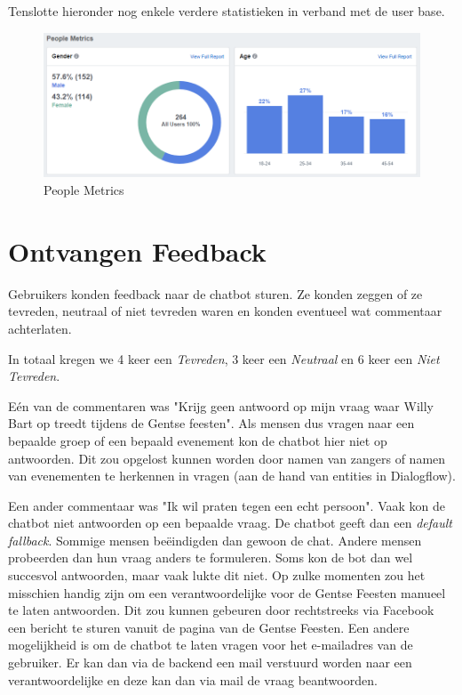 \documentclass[11pt, letterpaper, oneside]{article}
\begin{document}
	Tenslotte hieronder nog enkele verdere statistieken in verband met de user base.
	
	\begin{figure}[h]
		\centering
		\includegraphics[width=0.7\linewidth]{./figuren/people-metrics}
		\caption{People Metrics}
		\label{people-metrics}
	\end{figure}

	\clearpage
	
	\section{Ontvangen Feedback}
	
	Gebruikers konden feedback naar de chatbot sturen. Ze konden zeggen of ze tevreden, neutraal of niet tevreden waren en konden eventueel wat commentaar achterlaten.
	
	In totaal kregen we 4 keer een \textit{Tevreden}, 3 keer een \textit{Neutraal} en 6 keer een \textit{Niet Tevreden}.
	
	Eén van de commentaren was "Krijg geen antwoord op mijn vraag waar Willy Bart  op treedt tijdens de Gentse feesten". Als mensen dus vragen naar een bepaalde groep of een bepaald evenement kon de chatbot hier niet op antwoorden. Dit zou opgelost kunnen worden door namen van zangers of namen van evenementen te herkennen in vragen (aan de hand van entities in Dialogflow).
	
	Een ander commentaar was "Ik wil praten tegen een echt persoon". Vaak kon de chatbot niet antwoorden op een bepaalde vraag. De chatbot geeft dan een \textit{default fallback}. Sommige mensen beëindigden dan gewoon de chat. Andere mensen probeerden dan hun vraag anders te formuleren. Soms kon de bot dan wel succesvol antwoorden, maar vaak lukte dit niet. Op zulke momenten zou het misschien handig zijn om een verantwoordelijke voor de Gentse Feesten manueel te laten antwoorden. Dit zou kunnen gebeuren door rechtstreeks via Facebook een bericht te sturen vanuit de pagina van de Gentse Feesten. Een andere mogelijkheid is om de chatbot te laten vragen voor het e-mailadres van de gebruiker. Er kan dan via de backend een mail verstuurd worden naar een verantwoordelijke en deze kan dan via mail de vraag beantwoorden.
\end{document}

